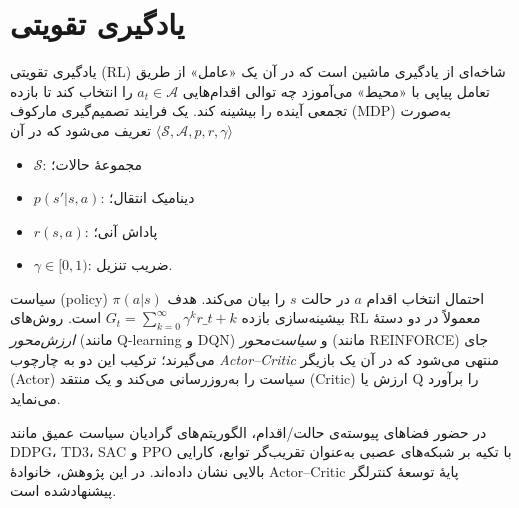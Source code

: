 %

\section{یادگیری تقویتی}\label{sec:rl}

یادگیری تقویتی (RL) شاخه‌ای از یادگیری ماشین است که در آن یک «عامل» از طریق تعامل پیاپی با «محیط» می‌آموزد چه توالی اقدام‌هایی $a_t\in\mathcal{A}$ را انتخاب کند تا بازده تجمعی آینده را بیشینه کند. یک فرایند تصمیم‌گیری مارکوف (MDP) به‌صورت $\langle\mathcal{S},\mathcal{A},p,r,\gamma\rangle$ تعریف می‌شود که در آن
\begin{itemize}
	\item $\mathcal{S}$: مجموعهٔ حالات؛
	\item $p(s'|s,a)$: دینامیک انتقال؛
	\item $r(s,a)$: پاداش آنی؛
	\item $\gamma\in[0,1)$: ضریب تنزیل.
\end{itemize}
\noindent
سیاست (policy) $\pi(a|s)$ احتمال انتخاب اقدام $a$ در حالت $s$ را بیان می‌کند. هدف بیشینه‌سازی بازده $G_t=\sum_{k=0}^{\infty}\gamma^k r\_{t+k}$ است. روش‌های RL معمولاً در دو دستهٔ \textit{ارزش‌محور} (مانند Q-learning و DQN) و \textit{سیاست‌محور} (مانند REINFORCE) جای می‌گیرند؛ ترکیب این دو به چارچوب \textit{Actor–Critic} منتهی می‌شود که در آن یک بازیگر (Actor) سیاست را به‌روزرسانی می‌کند و یک منتقد (Critic) ارزش یا Q را برآورد می‌نماید.

در حضور فضاهای پیوسته‌ی حالت/اقدام، الگوریتم‌های گرادیان سیاست عمیق مانند DDPG، TD3، SAC و PPO با تکیه بر شبکه‌های عصبی به‌عنوان تقریب‌گر توابع، کارایی بالایی نشان داده‌اند. در این پژوهش، خانوادهٔ Actor–Critic پایهٔ توسعهٔ کنترلگر پیشنهادشده است.
